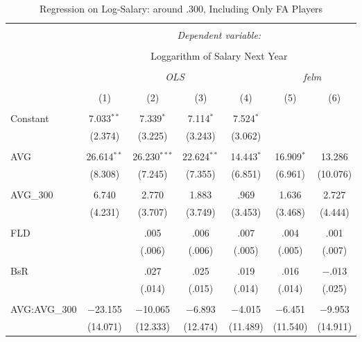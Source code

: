 
\begin{table}[H] \centering
  \caption{Regression on Log-Salary: around .300, Including Only FA Players}
  \label{AVG300_F}
\tiny
\begin{tabular}{@{\extracolsep{5pt}}lcccccc}
\\[-1.8ex]\hline
\hline \\[-1.8ex]
 & \multicolumn{6}{c}{\textit{Dependent variable:}} \\
\cline{2-7}
\\[-1.8ex] & \multicolumn{6}{c}{Loggarithm of Salary Next Year} \\
\\[-1.8ex] & \multicolumn{4}{c}{\textit{OLS}} & \multicolumn{2}{c}{\textit{felm}} \\
\\[-1.8ex] & (1) & (2) & (3) & (4) & (5) & (6)\\
\hline \\[-1.8ex]
 Constant & 7.033$^{**}$ & 7.339$^{*}$ & 7.114$^{*}$ & 7.524$^{*}$ &  &  \\
  & (2.374) & (3.225) & (3.243) & (3.062) &  &  \\
  & & & & & & \\
 AVG & 26.614$^{**}$ & 26.230$^{***}$ & 22.624$^{**}$ & 14.443$^{*}$ & 16.909$^{*}$ & 13.286 \\
  & (8.308) & (7.245) & (7.355) & (6.851) & (6.961) & (10.076) \\
  & & & & & & \\
 AVG\_300 & 6.740 & 2.770 & 1.883 & .969 & 1.636 & 2.727 \\
  & (4.231) & (3.707) & (3.749) & (3.453) & (3.468) & (4.444) \\
  & & & & & & \\
 FLD &  & .005 & .006 & .007 & .004 & .001 \\
  &  & (.006) & (.006) & (.005) & (.005) & (.007) \\
  & & & & & & \\
 BsR &  & .027 & .025 & .019 & .016 & $-$.013 \\
  &  & (.014) & (.015) & (.014) & (.014) & (.025) \\
  & & & & & & \\
 AVG:AVG\_300 & $-$23.155 & $-$10.065 & $-$6.893 & $-$4.015 & $-$6.451 & $-$9.953 \\
  & (14.071) & (12.333) & (12.474) & (11.489) & (11.540) & (14.911) \\

\end{tabular}
\end{table}
